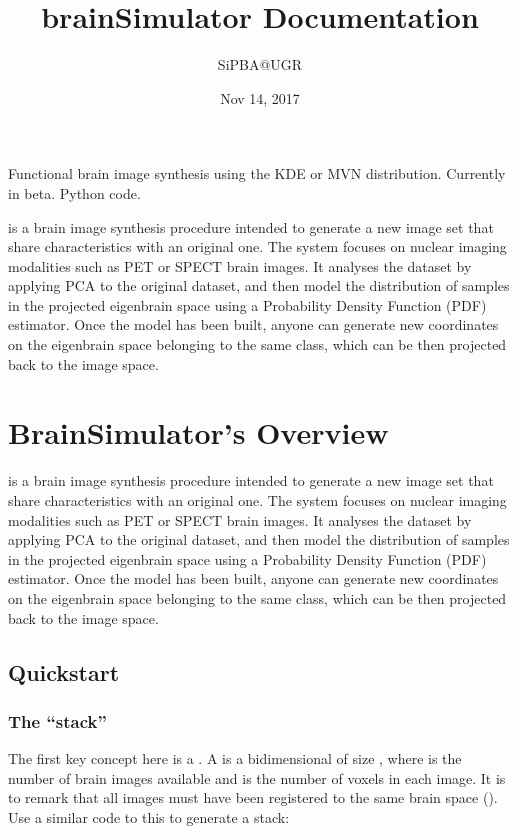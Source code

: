 \documentclass[letterpaper,10pt,english]{sphinxmanual}
\title{brainSimulator Documentation}
\date{Nov 14, 2017}
\author{SiPBA@UGR}
\begin{document}
\maketitle
\sphinxtableofcontents
{}\label{\detokenize{index::doc}}


Functional brain image synthesis using the KDE or MVN distribution. Currently in beta. Python code.

 is a brain image synthesis procedure intended to generate a new image set that share characteristics with an original one. The system focuses on nuclear imaging modalities such as PET or SPECT brain images. It analyses the dataset by applying PCA to the original dataset, and then model the distribution of samples in the projected eigenbrain space using a Probability Density Function (PDF) estimator. Once the model has been built, anyone can generate new coordinates on the eigenbrain space belonging to the same class, which can be then projected back to the image space.


\chapter{BrainSimulator’s Overview}
\label{\detokenize{overview:welcome-to-brainsimulator-s-documentation}}\label{\detokenize{overview::doc}}\label{\detokenize{overview:brainsimulator-s-overview}}
 is a brain image synthesis procedure intended to generate a new image set that share characteristics with an original one. The system focuses on nuclear imaging modalities such as PET or SPECT brain images. It analyses the dataset by applying PCA to the original dataset, and then model the distribution of samples in the projected eigenbrain space using a Probability Density Function (PDF) estimator. Once the model has been built, anyone can generate new coordinates on the eigenbrain space belonging to the same class, which can be then projected back to the image space.

\begin{figure}[htbp]
\centering

\noindent{}
\end{figure}


\section{Quickstart}
\label{\detokenize{overview:quickstart}}

\subsection{The “stack”}
\label{\detokenize{overview:the-stack}}
The first key concept here is a . A  is a bidimensional  of size , where  is the number of brain images available and  is the number of voxels in each image. It is  to remark that all images must have been registered to the same brain space (). Use a similar code to this to generate a stack:
\end{document}
